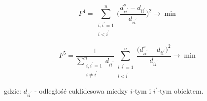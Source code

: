 \documentclass[12pt,a4paper]{report}
\begin{document}
\begin{equation}
F^{4}=\sum_{\substack{i,i^{'}=1 \\ i<i^{'}}}^{n} \bigg( \frac{d_{ii^{'}}^{s} - d_{ii^{'}}}{d_{ii^{'}}} \bigg) ^2  \rightarrow     \min  
\end{equation}

\begin{equation}
F^{5}=\frac{1}{\sum\limits_ {\substack{i,i^{'}=1 \\ i\neq i^{'}}}^{n} d_{ii^{'}}} \sum_{\substack{i,i^{'}=1 \\ i<i^{'}}}^{n} \frac{\bigg(d_{ii^{'}}^{s} - d_{ii^{'}}\bigg)^2}{d_{ii^{'}}}\rightarrow     \min  
\end{equation}

gdzie:
\newline
$d_{ii^{'}}$ - odległość euklidesowa miedzy $i$-tym i $i^{'}$-tym obiektem.\\




\end{document}
